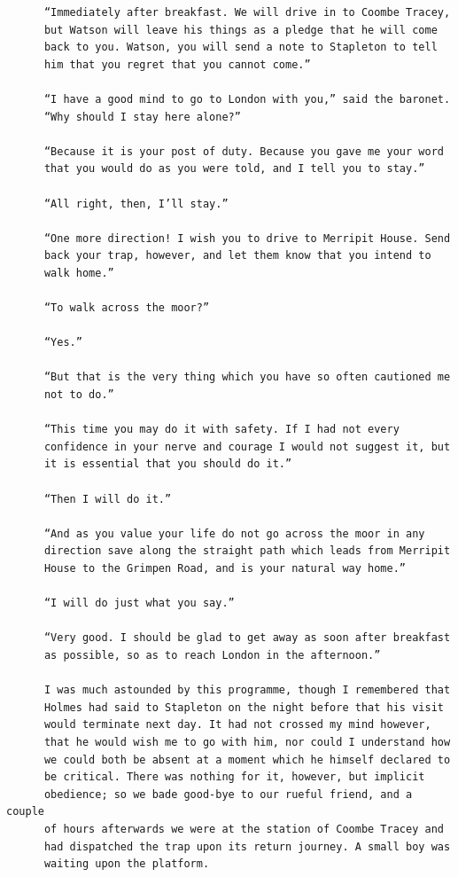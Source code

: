 \documentclass{article}
\begin{document}
\begin{verbatim}
      “Immediately after breakfast. We will drive in to Coombe Tracey,
      but Watson will leave his things as a pledge that he will come
      back to you. Watson, you will send a note to Stapleton to tell
      him that you regret that you cannot come.”

      “I have a good mind to go to London with you,” said the baronet.
      “Why should I stay here alone?”

      “Because it is your post of duty. Because you gave me your word
      that you would do as you were told, and I tell you to stay.”

      “All right, then, I’ll stay.”

      “One more direction! I wish you to drive to Merripit House. Send
      back your trap, however, and let them know that you intend to
      walk home.”

      “To walk across the moor?”

      “Yes.”

      “But that is the very thing which you have so often cautioned me
      not to do.”

      “This time you may do it with safety. If I had not every
      confidence in your nerve and courage I would not suggest it, but
      it is essential that you should do it.”

      “Then I will do it.”

      “And as you value your life do not go across the moor in any
      direction save along the straight path which leads from Merripit
      House to the Grimpen Road, and is your natural way home.”

      “I will do just what you say.”

      “Very good. I should be glad to get away as soon after breakfast
      as possible, so as to reach London in the afternoon.”

      I was much astounded by this programme, though I remembered that
      Holmes had said to Stapleton on the night before that his visit
      would terminate next day. It had not crossed my mind however,
      that he would wish me to go with him, nor could I understand how
      we could both be absent at a moment which he himself declared to
      be critical. There was nothing for it, however, but implicit
      obedience; so we bade good-bye to our rueful friend, and a couple
      of hours afterwards we were at the station of Coombe Tracey and
      had dispatched the trap upon its return journey. A small boy was
      waiting upon the platform.


\end{verbatim}
\end{document}
